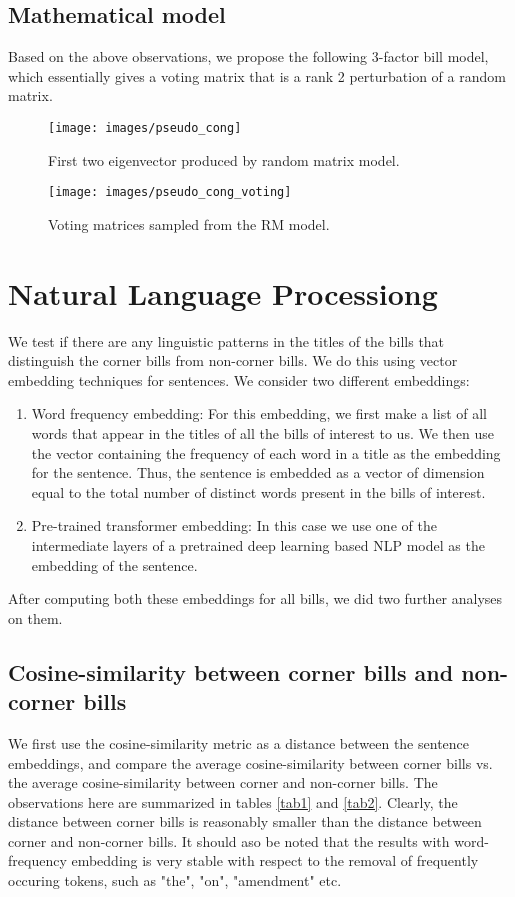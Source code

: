 \documentclass[11pt, letter]{article}
\begin{document}
\subsection{Mathematical model}
        Based on the above observations, we propose the following 3-factor bill model, which
        essentially gives a voting matrix that is a rank 2 perturbation of a random matrix.
        \begin{figure}[t]
        \texttt{[image: images/pseudo\_cong]}
        \centering
        \caption{First two eigenvector produced by random matrix model.}
        \end{figure}
        \begin{figure}[t]
        \texttt{[image: images/pseudo\_cong\_voting]}
        \centering
        \caption{Voting matrices sampled from the RM model.}
        \end{figure}


        \section{Natural Language Processiong}
        We test if there are any linguistic patterns in the titles of the bills
        that distinguish the corner bills from non-corner bills. 
        We do this using vector embedding techniques for sentences. We consider
        two different embeddings:
        \begin{enumerate}
            \item Word frequency embedding: For this embedding, we first make a list of all
                words that appear in the titles of all the bills of interest to us. 
                We then use the vector containing the frequency of each word in a title
                as the embedding for the sentence. Thus, the sentence is embedded
                as a vector of dimension equal to the total number of distinct words 
                present in the bills of interest.
            \item Pre-trained transformer embedding: In this case we use one of the intermediate
                layers of a pretrained deep learning based NLP model as the embedding of
                the sentence.
        \end{enumerate}
        After computing both these embeddings for all bills, we did two further analyses on them.
        \subsection{Cosine-similarity between corner bills and non-corner bills}
        We first use the cosine-similarity metric as a distance between the sentence embeddings,
        and compare the average cosine-similarity between corner bills vs. the average cosine-similarity
        between corner and non-corner bills. The observations here are summarized in tables \ref{tab1} and
        \ref{tab2}. Clearly, the distance between corner bills is reasonably smaller than the distance between
        corner and non-corner bills. It should aso be noted that the results with word-frequency embedding is very stable with
        respect to the removal of frequently occuring tokens, such as "the", "on", "amendment" etc.
        
\end{document}
